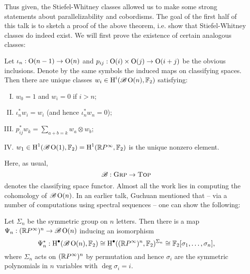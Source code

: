 \documentclass{amsart}
\begin{document}
Thus given, the Stiefel-Whitney classes allowed us to make some strong statements about parallelizability
and cobordisms. The goal of the first half of this talk is to sketch a proof of the above theorem, i.e.
show that Stiefel-Whitney classes do indeed exist. We will first prove the existence of certain analogous
classes:
\begin{theorem}
    Let $\iota_n:\operatorname{O}(n-1)\to\operatorname{O}(n)$ and $p_{ij}:\operatorname{O}(i)\times \operatorname{O}(j)\to \operatorname{O}(i+j)$ be the obvious
    inclusions. Denote by the same symbols the induced maps on classifying spaces.
    Then there are unique classes $w_i\in \operatorname{H}^i(\mathscr{B}\operatorname{O}(n), \mathbb{F}_2)$ satisfying:
    \begin{enumerate}[(I)]
        \item $w_0=1$ and $w_i=0$ if $i>n$;
        \item $\iota_n^*w_i=w_i$ (and hence $\iota_n^*w_n=0$);
        \item $p_{ij}^*w_k=\sum_{a+b=k}w_a\otimes w_b$;
        \item $w_1\in\operatorname{H}^1(\mathscr{B}\operatorname{O}(1),\mathbb{F}_2)=\operatorname{H}^1(\mathbb{R} P^\infty,\mathbb{F}_2)$ is the unique nonzero element.
    \end{enumerate}
    \label{sw2}
\end{theorem}
Here, as usual,
\begin{equation*}
    \mathscr{B}:\textsc{Grp}\to\textsc{Top}
\end{equation*}
denotes the classifying space functor.
Almost all the work lies in computing the cohomology of $\mathscr{B}\operatorname{O}(n)$. In an earlier talk,
Guchuan mentioned that -- via a number of computations using spectral sequences -- one
can show the following:
\begin{lemma}
    Let $\Sigma_n$ be the symmetric group on $n$ letters. Then there is a map $\Psi_n:(\mathbb{R} P^\infty)^n\to\mathscr{B}\operatorname{O}(n)$
    inducing an isomorphism
    \begin{equation*}
        \Psi_n^*:\operatorname{H}^\bullet(\mathscr{B}\operatorname{O}(n),\mathbb{F}_2) \cong \operatorname{H}^\bullet( (\mathbb{R} P^\infty)^n,\mathbb{F}_2)^{\Sigma_n}\cong\mathbb{F}_2[\sigma_1,\ldots,\sigma_n],
    \end{equation*}
    where $\Sigma_n$ acts on $(\mathbb{R} P^\infty)^n$ by permutation and hence $\sigma_i$ are the symmetric
    polynomials in $n$ variables with $\deg\sigma_i=i$.
    \label{computation}
\end{lemma}
\end{document}
